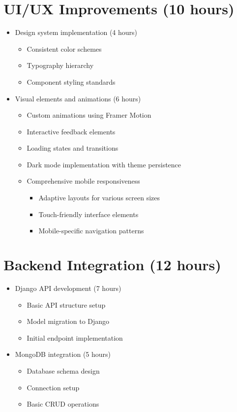 \documentclass[11pt]{article}
\begin{document}
\section{UI/UX Improvements (10 hours)}
\begin{itemize}[leftmargin=*]
  \item Design system implementation (4 hours)
  \begin{itemize}
    \item Consistent color schemes
    \item Typography hierarchy
    \item Component styling standards
  \end{itemize}
  \item Visual elements and animations (6 hours)
  \begin{itemize}
    \item Custom animations using Framer Motion
    \item Interactive feedback elements
    \item Loading states and transitions
    \item Dark mode implementation with theme persistence
    \item Comprehensive mobile responsiveness
    \begin{itemize}
      \item Adaptive layouts for various screen sizes
      \item Touch-friendly interface elements
      \item Mobile-specific navigation patterns
    \end{itemize}
  \end{itemize}
\end{itemize}

\section{Backend Integration (12 hours)}
\begin{itemize}[leftmargin=*]
  \item Django API development (7 hours)
  \begin{itemize}
    \item Basic API structure setup
    \item Model migration to Django
    \item Initial endpoint implementation
  \end{itemize}
  \item MongoDB integration (5 hours)
  \begin{itemize}
    \item Database schema design
    \item Connection setup
    \item Basic CRUD operations
  \end{itemize}
\end{itemize}
\end{document}
